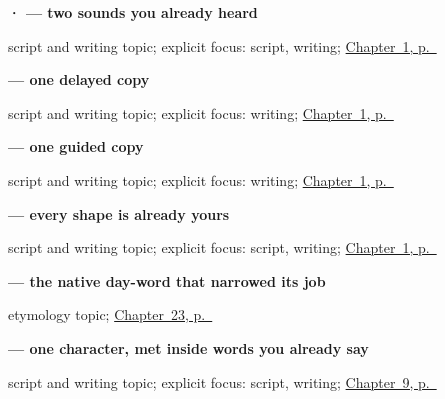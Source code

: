 \noindent\begin{minipage}[t]{\linewidth}
\raggedright
\textbf{ ·  — two sounds you already heard}\par
\footnotesize script and writing topic; explicit focus: script, writing; \hyperref[ch:greetings]{Chapter~1, p.~\pageref*{ch:greetings}}
\end{minipage}\par\smallskip

\noindent\begin{minipage}[t]{\linewidth}
\raggedright
\textbf{ — one delayed copy}\par
\footnotesize script and writing topic; explicit focus: writing; \hyperref[ch:greetings]{Chapter~1, p.~\pageref*{ch:greetings}}
\end{minipage}\par\smallskip

\noindent\begin{minipage}[t]{\linewidth}
\raggedright
\textbf{ — one guided copy}\par
\footnotesize script and writing topic; explicit focus: writing; \hyperref[ch:greetings]{Chapter~1, p.~\pageref*{ch:greetings}}
\end{minipage}\par\smallskip

\noindent\begin{minipage}[t]{\linewidth}
\raggedright
\textbf{ — every shape is already yours}\par
\footnotesize script and writing topic; explicit focus: script, writing; \hyperref[ch:greetings]{Chapter~1, p.~\pageref*{ch:greetings}}
\end{minipage}\par\smallskip

\noindent\begin{minipage}[t]{\linewidth}
\raggedright
\textbf{ — the native day-word that narrowed its job}\par
\footnotesize etymology topic; \hyperref[ch:ml-day]{Chapter~23, p.~\pageref*{ch:ml-day}}
\end{minipage}\par\smallskip

\noindent\begin{minipage}[t]{\linewidth}
\raggedright
\textbf{ — one character, met inside words you already say}\par
\footnotesize script and writing topic; explicit focus: script, writing; \hyperref[ch:ml-sorry]{Chapter~9, p.~\pageref*{ch:ml-sorry}}
\end{minipage}\par\smallskip

